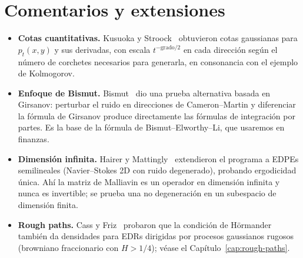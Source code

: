 \section{Comentarios y extensiones}
\begin{itemize}
  \item \textbf{Cotas cuantitativas.} Kusuoka y Stroock~\cite{KusuokaStroock} obtuvieron cotas gaussianas para $p_t(x,y)$
  y sus derivadas, con escala $t^{-\text{grado}/2}$ en cada dirección según el número de corchetes
  necesarios para generarla, en consonancia con el ejemplo de Kolmogorov.
  \item \textbf{Enfoque de Bismut.} Bismut~\cite{Bismut81} dio una prueba alternativa basada en Girsanov:
  perturbar el ruido en direcciones de Cameron--Martin y diferenciar la fórmula de Girsanov
  produce directamente las fórmulas de integración por partes. Es la base de la fórmula de
  Bismut--Elworthy--Li, que usaremos en finanzas.
  \item \textbf{Dimensión infinita.} Hairer y Mattingly~\cite{HairerMattingly11} extendieron el programa a EDPEs semilineales
  (Navier--Stokes 2D con ruido degenerado), probando ergodicidad única. Ahí la
  matriz de Malliavin es un operador en dimensión infinita y nunca es invertible; se prueba
  una no degeneración en un subespacio de dimensión finita.
  \item \textbf{Rough paths.} Cass y Friz~\cite{CassFriz10} probaron que la condición de Hörmander también da
  densidades para EDRs dirigidas por procesos gaussianos rugosos (browniano fraccionario
  con $H>1/4$); véase el Capítulo~\ref{cap:rough-paths}.
\end{itemize}
